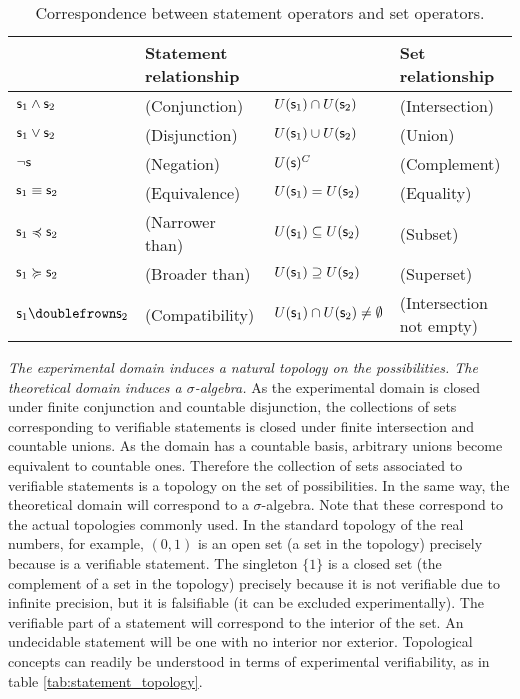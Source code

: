 \documentclass[twocolumn]{article}
\begin{document}
\begin{table*}[h]
	\centering
	\begin{tabular}{p{} p{} p{} p{}}
		& Statement relationship & & Set relationship  \\ 
		\hline 
		$\mathsf{s}_1 \wedge \mathsf{s}_2$ & (Conjunction) & $U(\mathsf{s}_1) \cap U(\mathsf{s}_2)$ & (Intersection) \\ 
		$\mathsf{s}_1 \vee \mathsf{s}_2$ & (Disjunction) & $U(\mathsf{s}_1) \cup U(\mathsf{s}_2)$ & (Union) \\ 
		$\neg \mathsf{s}$ & (Negation) & $U(\mathsf{s})^C$ & (Complement) \\ 
		$\mathsf{s}_1 \equiv \mathsf{s}_2$ & (Equivalence) & $U(\mathsf{s}_1) = U(\mathsf{s}_2)$ & (Equality) \\ 
		$\mathsf{s}_1 \preccurlyeq \mathsf{s}_2$ & (Narrower than) & $U(\mathsf{s}_1) \subseteq U(\mathsf{s}_2)$ & (Subset) \\ 
		$\mathsf{s}_1 \succcurlyeq \mathsf{s}_2$ & (Broader than) & $U(\mathsf{s}_1) \supseteq U(\mathsf{s}_2)$ & (Superset) \\ 
		$\stmt_1 \comp \stmt_2$ & (Compatibility) & $U(\mathsf{s}_1) \cap U(\mathsf{s}_2) \neq \emptyset$ & (Intersection not empty)
	\end{tabular} 
	\caption{Correspondence between statement operators and set operators.}\label{tab:statement_set}
\end{table*}

\textit{The experimental domain induces a natural topology on the possibilities. The theoretical domain induces a $\sigma$-algebra.} As the experimental domain is closed under finite conjunction and countable disjunction, the collections of sets corresponding to verifiable statements is closed under finite intersection and countable unions. As the domain has a countable basis, arbitrary unions become equivalent to countable ones. Therefore the collection of sets associated to verifiable statements is a topology on the set of possibilities. In the same way, the theoretical domain will correspond to a $\sigma$-algebra. Note that these correspond to the actual topologies commonly used. In the standard topology of the real numbers, for example, $(0,1)$ is an open set (a set in the topology) precisely because  is a verifiable statement. The singleton $\{1\}$ is a closed set (the complement of a set in the topology) precisely because it is not verifiable due to infinite precision, but it is falsifiable (it can be excluded experimentally). The verifiable part of a statement will correspond to the interior of the set. An undecidable statement will be one with no interior nor exterior. Topological concepts can readily be understood in terms of experimental verifiability, as in table \ref{tab:statement_topology}.
\end{document}
